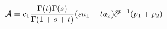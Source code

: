 \begin{equation}
{\cal{A}}  =   c_1\frac{\Gamma(t) \Gamma(s)}{\Gamma(1+s+t)} (s a_1 -t
a_2) \delta^{p+1}(p_1+p_2)
\label{venez}
\end{equation}

